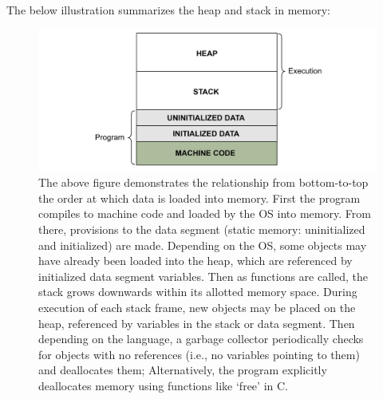 \noindent
The below illustration summarizes the heap and stack in memory:
\begin{figure}[!ht]

    \hspace{-6em} \includegraphics[width=1.3\textwidth]{./Sections/stacks_heaps/stack_heap_memory.png}
    \caption{The above figure demonstrates the relationship from bottom-to-top the order at which data is 
    loaded into memory. First the program compiles to machine code and loaded by the OS into memory.
    From there, provisions to the data segment (static memory: uninitialized and initialized) are made. Depending 
    on the OS, some objects may have already been loaded into the heap, which are referenced by initialized data segment variables.
    Then as functions are called, the stack grows downwards within its allotted memory space. During execution of each stack frame,
    new objects may be placed on the heap, referenced by variables in the stack or data segment. Then depending on the language,
    a garbage collector periodically checks for objects with no references (i.e., no variables pointing to them) and deallocates them;
    Alternatively, the program explicitly deallocates memory using functions like `free' in C.}
    \label{fig:stack_heap_memory}
\end{figure}